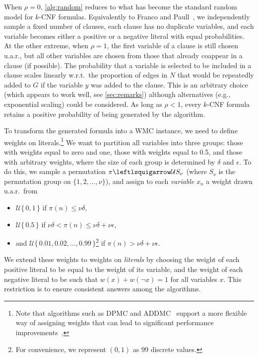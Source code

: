 \documentclass[runningheads]{llncs}
\begin{document}
When $\rho=0$, \cref{alg:random} reduces to what has become the standard random
model for $k$-CNF formulas. Equivalently to
Franco and Paull~\cite{DBLP:journals/dam/FrancoP83},
we independently sample a fixed number of clauses, each clause has no duplicate
variables, and each variable becomes either a positive or a negative literal
with equal probabilities. At the other extreme, when $\rho = 1$, the first
variable of a clause is still chosen u.a.r., but all other variables are chosen
from those that already coappear in a clause (if possible). The probability that
a variable is selected to be included in a clause scales linearly w.r.t.\ the
proportion of edges in $N$ that would be repeatedly added to $G$ if the variable
$y$ was added to the clause. This is an arbitrary choice (which appears to work
well, see \cref{sec:remarks}) although alternatives (e.g., exponential scaling)
could be considered. As long as $\rho < 1$, every $k$-CNF formula retains a
positive probability of being generated by the algorithm.

To transform the generated formula into a \textsf{WMC} instance, we need to
define weights on literals.\footnote{Note that algorithms such as \textsc{DPMC}
  and \textsc{ADDMC}~\cite{DBLP:conf/aaai/DudekPV20,DBLP:conf/cp/DudekPV20}
  support a more flexible way of assigning weights that can lead to significant
  performance
  improvements~\cite{DBLP:conf/uai/DilkasB21,DBLP:conf/sat/DilkasB21}.} We want
to partition all variables into three groups: those with weights equal to zero
and one, those with weights equal to 0.5, and those with arbitrary weights,
where the size of each group is determined by $\delta$ and $\epsilon$. To do
this, we sample a permutation $\pi \leftlsquigarrow \mathcal{U}S_\nu$ (where
$S_\nu$ is the permutation group on $\{1, 2, \dots, \nu \}$), and assign to each
\emph{variable} $x_n$ a weight drawn u.a.r.\ from
\begin{itemize}
\item $\mathcal{U}\{\,0, 1\,\}$ if $\pi(n) \le \nu\delta$,
\item $\mathcal{U}\{\,0.5\,\}$ if $\nu\delta < \pi(n) \le \nu\delta +
  \nu\epsilon$,
\item and $\mathcal{U}\{\, 0.01, 0.02, \dots, 0.99 \,\}$\footnote{For
    convenience, we represent $(0, 1)$ as 99 discrete values.} if $\pi(n) >
  \nu\delta + \nu\epsilon$.
\end{itemize}
We extend these weights to weights on \emph{literals} by choosing the weight of
each positive literal to be equal to the weight of its variable, and the weight
of each negative literal to be such that $w(x) + w(\neg x) = 1$ for all
variables $x$. This restriction is to ensure consistent answers among the
algorithms.
\end{document}
